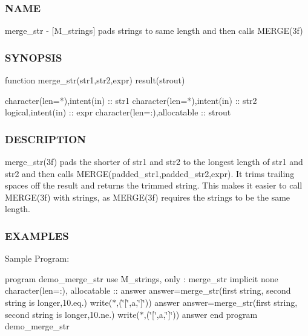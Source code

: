 \subsubsection*{N\+A\+ME}

merge\+\_\+str -\/ \mbox{[}M\+\_\+strings\mbox{]} pads strings to same length and then calls M\+E\+R\+G\+E(3f) 

\subsubsection*{S\+Y\+N\+O\+P\+S\+IS}

\begin{DoxyVerb}function merge_str(str1,str2,expr) result(strout)

 character(len=*),intent(in)     :: str1
 character(len=*),intent(in)     :: str2
 logical,intent(in)              :: expr
 character(len=:),allocatable    :: strout
\end{DoxyVerb}


\subsubsection*{D\+E\+S\+C\+R\+I\+P\+T\+I\+ON}

merge\+\_\+str(3f) pads the shorter of str1 and str2 to the longest length of str1 and str2 and then calls M\+E\+R\+G\+E(padded\+\_\+str1,padded\+\_\+str2,expr). It trims trailing spaces off the result and returns the trimmed string. This makes it easier to call M\+E\+R\+G\+E(3f) with strings, as M\+E\+R\+G\+E(3f) requires the strings to be the same length.

\subsubsection*{E\+X\+A\+M\+P\+L\+ES}

Sample Program\+:

program demo\+\_\+merge\+\_\+str use M\+\_\+strings, only \+: merge\+\_\+str implicit none character(len=\+:), allocatable \+:\+: answer answer=merge\+\_\+str(\textquotesingle{}first string\textquotesingle{}, \textquotesingle{}second string is longer\textquotesingle{},10.\+eq.) write($\ast$,\textquotesingle{}(\char`\"{}\mbox{[}\char`\"{},a,\char`\"{}\mbox{]}\char`\"{})\textquotesingle{}) answer answer=merge\+\_\+str(\textquotesingle{}first string\textquotesingle{}, \textquotesingle{}second string is longer\textquotesingle{},10.\+ne.) write($\ast$,\textquotesingle{}(\char`\"{}\mbox{[}\char`\"{},a,\char`\"{}\mbox{]}\char`\"{})\textquotesingle{}) answer end program demo\+\_\+merge\+\_\+str

